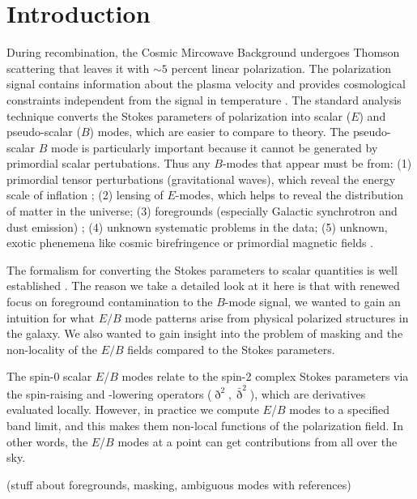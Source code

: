 \section{Introduction}
During recombination, the Cosmic Mircowave Background undergoes Thomson scattering that leaves it with $\sim 5$ percent linear polarization.  The polarization signal contains information about the plasma velocity and provides cosmological constraints independent from the signal in temperature \citep{1997NewA....2..323H}.  The standard analysis technique converts the Stokes parameters of polarization into scalar ($E$) and pseudo-scalar ($B$) modes, which are easier to compare to theory.  The pseudo-scalar $B$ mode is particularly important because it cannot be generated by primordial scalar pertubations.  Thus any $B$-modes that appear must be from:
(1) primordial tensor perturbations (gravitational waves), which reveal the energy scale of inflation
\citep{1997PhRvD..56..596H,1997PhRvL..78.2054S};
(2) lensing of $E$-modes, which helps to reveal the distribution of matter in the universe;
(3) foregrounds (especially Galactic synchrotron and dust emission)
\citep{2016A&A...586A.133P};
(4) unknown systematic problems in the data;
(5) unknown, exotic phenemena like cosmic birefringence or primordial magnetic fields
\citep{1996ApJ...469....1K,1999PhRvL..83.1506L,2004ApJ...616....1C,2014MNRAS.438.2508P}.
 
 
The formalism for converting the Stokes parameters to scalar quantities is well established \citep{1997PhRvD..55.7368K,1997PhRvD..55.1830Z}.  The reason we take a detailed look at it here is that with renewed focus on foreground contamination to the $B$-mode signal, we wanted to gain an intuition for what $E/B$ mode patterns arise from physical polarized structures in the galaxy.  We also wanted to gain insight into the problem of masking and the non-locality of the $E/B$ fields compared to the Stokes parameters.

The spin-0 scalar $E$/$B$ modes relate to the spin-2 complex Stokes parameters via the spin-raising and -lowering operators ($\eth^2,\bar \eth^2$), which are derivatives evaluated locally.  However, in practice we compute $E$/$B$ modes to a specified band limit, and this makes them non-local functions of the polarization field.  In other words, the $E$/$B$ modes at a point can get contributions from all over the sky.

(stuff about foregrounds, masking, ambiguous modes with references)
 
